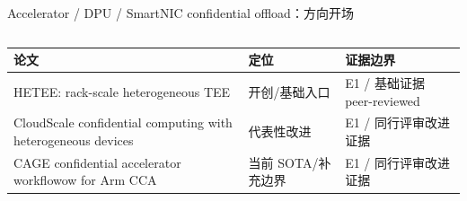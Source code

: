 \begin{frame}[t,shrink=6]{Accelerator / DPU / SmartNIC confidential offload：方向开场}
\begin{columns}[T,totalwidth=\textwidth]
\begin{column}{0.49\textwidth}
{\begin{minipage}[t]{0.97\linewidth}
\begin{minipage}{0.92\linewidth}
{\begin{tabularx}{\linewidth}{@{}YYY@{}}
\toprule
\textbf{论文} & \textbf{定位} & \textbf{证据边界} \\
\midrule
HETEE: rack-scale heterogeneous TEE & 开创/基础入口 & E1 / 基础证据 peer-reviewed \\
CloudScale confidential computing with heterogeneous devices & 代表性改进 & E1 / 同行评审改进证据 \\
CAGE confidential accelerator workflowow for Arm CCA & 当前 SOTA/补充边界 & E1 / 同行评审改进证据 \\
\bottomrule
\end{tabularx}
}
    \end{minipage}
    \vspace{1mm}
  \end{minipage}}
  \end{column}
\end{columns}
\end{frame}


